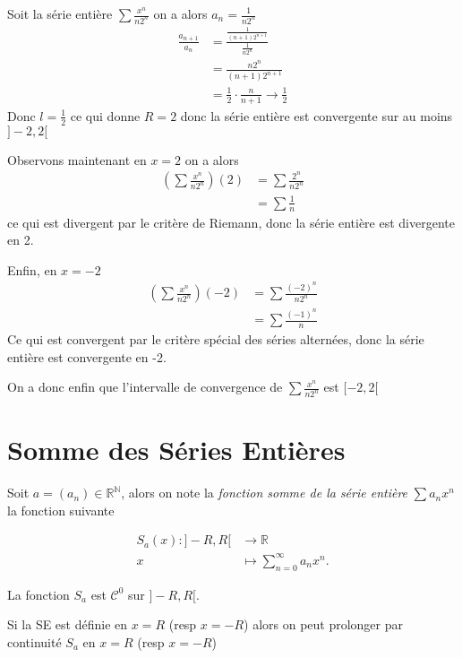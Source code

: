 \documentclass[11pt,colorlinks]{book}
\theoremstyle{mytheoremstyle}
\theoremstyle{mytheoremstyle}
\theoremstyle{mytheoremstyle}
\theoremstyle{mytheoremstyle}
\theoremstyle{mytheoremstyle}
\theoremstyle{mytheoremstyle}
\theoremstyle{mytheoremstyle}
\theoremstyle{mytheoremstyle}
\theoremstyle{myproblemstyle}
\def\mbb#1{\mathbb{#1}}
\def\bN{\mbb{N}}
\def\bR{\mbb{R}}
\def\mC{\mathcal{C}}
\def\rN{\bR^{\bN}}
\newcommand{\vfunc}[5]{
  \begin{align*}
    #1 \colon #2 &\to #3\\
    #4 &\mapsto #5.
  \end{align*}
}
\begin{document}
\begin{ex}
  Soit la série entière $\sum \frac{x^n}{n2^n}$ on a alors $a_n = \frac{1}{n2^n}$
  \begin{align*}
    \frac{a_{n+1}}{a_n} &= \frac{\frac{1}{(n+1)2^{n+1}}}{\frac{1}{n2^n}} \\ 
    &= \frac{n2^n}{(n+1)2^{n+1}} \\
    &= \frac{1}{2} \cdot \frac{n}{n+1}
    \to \frac{1}{2}
  \end{align*}
  Donc $l = \frac{1}{2}$ ce qui donne $R = 2$ donc la série entière est convergente sur au moins $]-2,2[$\newline

  Observons maintenant en $x=2$ on a alors 
  \begin{align*}
    \left(\sum \frac{x^n}{n2^n}\right)(2) &= \sum \frac{2^n}{n2^n} \\ 
    &= \sum \frac{1}{n}
  \end{align*}
  ce qui est divergent par le critère de Riemann, donc la série entière est divergente en 2.\newline

  Enfin, en $x=-2$
  \begin{align*}
    \left(\sum \frac{x^n}{n2^n}\right)(-2) &= \sum \frac{(-2)^n}{n2^n} \\ 
    &= \sum \frac{(-1)^n}{n}
  \end{align*}
  Ce qui est convergent par le critère spécial des séries alternées, donc la série entière est convergente en -2.\newline


  On a donc enfin que l'intervalle de convergence de $\sum \frac{x^n}{n2^n}$ est $[-2,2[$
\end{ex}
\section{Somme des Séries Entières}
\begin{definition}
  Soit $a = (a_n) \in \rN$, alors on note la \textit{fonction somme de la série entière} $\sum a_n x^n$ la fonction suivante
  \vfunc{S_a(x)}{]-R,R[}{\bR}{x}{\sum_{n=0}^{\infty} a_n x^n}
\end{definition}
\begin{prop}
  La fonction $S_a$ est $\mC^0$ sur $]-R,R[$.
\end{prop}
\begin{rmq}
  Si la SE est définie en $x=R$ (resp $x=-R$) alors on peut prolonger par continuité $S_a$ en $x=R$ (resp $x=-R$)
\end{rmq}
\end{document}
